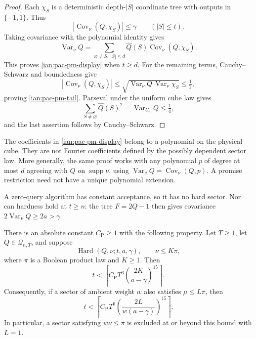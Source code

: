 \begin{proof}
Each \(\chi_S\) is a deterministic depth-\(|S|\) coordinate tree
with outputs in \(\{-1,1\}\). Thus
\[
 |\operatorname{Cov}_\nu(Q,\chi_S)|\le\gamma
 \qquad(|S|\le t).
\]
Taking covariance with the polynomial identity gives
\[
 \operatorname{Var}_\nu Q
   =\sum_{\varnothing\ne S,\ |S|\le d}
        \widehat Q(S)\operatorname{Cov}_\nu(Q,\chi_S).
\]
This proves \eqref{ian:pac-pm-display} when \(t\ge d\).
For the remaining terms, Cauchy--Schwarz and boundedness give
\[
 |\operatorname{Cov}_\nu(Q,\chi_S)|
 \le\sqrt{\operatorname{Var}_\nu Q\,
                 \operatorname{Var}_\nu\chi_S}\le\tfrac12,
\]
proving \eqref{ian:pac-pm-tail}.
Parseval under the uniform cube law gives
\[
 \sum_{S\ne\varnothing}\widehat Q(S)^2
   =\operatorname{Var}_{U_n}Q\le\tfrac14,
\]
and the last assertion follows by Cauchy--Schwarz.
\end{proof}

\begin{remark}
\label{ian:pac-sector-coefficients}
The coefficients in \eqref{ian:pac-pm-display} belong to a polynomial on the physical
cube. They are not Fourier coefficients defined by the possibly
dependent sector law. More generally, the same proof works with
any polynomial \(p\) of degree at most \(d\) agreeing with \(Q\)
on \(\operatorname{supp}\nu\), using
\(\operatorname{Var}_\nu Q=\operatorname{Cov}_\nu(Q,p)\).
A promise restriction need not have a unique polynomial extension.

A zero-query algorithm has constant acceptance, so it has no hard sector.
Nor can hardness hold at \(t\ge n\): the tree
\(F=2Q-1\) then gives covariance
\(2\operatorname{Var}_\nu Q\ge2a>\gamma\).
\end{remark}

\begin{theorem}
\label{ian:pac-product-exclusion}
There is an absolute constant \(C_{\mathrm P}\ge1\) with the
following property. Let \(T\ge1\), let
\(Q\in\mathcal Q_{n,T}\), and suppose
\[
 \operatorname{Hard}(Q,\nu;t,a,\gamma),
 \qquad \nu\le K\pi,
\]
where \(\pi\) is a Boolean product law and \(K\ge1\).
Then
\[
 t<
 \left\lceil
 C_{\mathrm P}T^6
       \left(\frac{2K}{a-\gamma}\right)^{15}
 \right\rceil.
 \tag{32.5}
\]
Consequently, if a sector of ambient weight \(w\) also satisfies
\(\mu\le L\pi\), then
\[
 t<
 \left\lceil
 C_{\mathrm P}T^6
       \left(\frac{2L}{w(a-\gamma)}\right)^{15}
 \right\rceil.
\]
In particular, a sector satisfying \(w\nu\le\pi\) is excluded
at or beyond this bound with \(L=1\).
\end{theorem}

